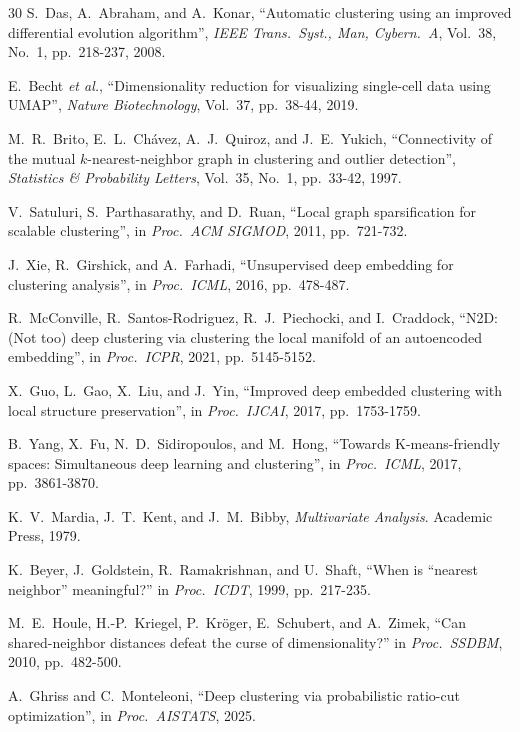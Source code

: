 \documentclass[journal]{IEEEtran}
\begin{document}
\begin{thebibliography}{30}
S.~Das, A.~Abraham, and A.~Konar, ``Automatic clustering using an improved differential evolution algorithm'', \emph{IEEE Trans.\ Syst., Man, Cybern.\ A}, Vol.~38, No.~1, pp.~218-237, 2008.

E.~Becht \emph{et al.}, ``Dimensionality reduction for visualizing single-cell data using UMAP'', \emph{Nature Biotechnology}, Vol.~37, pp.~38-44, 2019.

M.~R.~Brito, E.~L.~Ch\'{a}vez, A.~J.~Quiroz, and J.~E.~Yukich, ``Connectivity of the mutual $k$-nearest-neighbor graph in clustering and outlier detection'', \emph{Statistics \& Probability Letters}, Vol.~35, No.~1, pp.~33-42, 1997.

V.~Satuluri, S.~Parthasarathy, and D.~Ruan, ``Local graph sparsification for scalable clustering'', in \emph{Proc.\ ACM SIGMOD}, 2011, pp.~721-732.

J.~Xie, R.~Girshick, and A.~Farhadi, ``Unsupervised deep embedding for clustering analysis'', in \emph{Proc.\ ICML}, 2016, pp.~478-487.

R.~McConville, R.~Santos-Rodriguez, R.~J.~Piechocki, and I.~Craddock, ``N2D: (Not too) deep clustering via clustering the local manifold of an autoencoded embedding'', in \emph{Proc.\ ICPR}, 2021, pp.~5145-5152.

X.~Guo, L.~Gao, X.~Liu, and J.~Yin, ``Improved deep embedded clustering with local structure preservation'', in \emph{Proc.\ IJCAI}, 2017, pp.~1753-1759.

B.~Yang, X.~Fu, N.~D.~Sidiropoulos, and M.~Hong, ``Towards K-means-friendly spaces: Simultaneous deep learning and clustering'', in \emph{Proc.\ ICML}, 2017, pp.~3861-3870.

K.~V.~Mardia, J.~T.~Kent, and J.~M.~Bibby, \emph{Multivariate Analysis}. Academic Press, 1979.

K.~Beyer, J.~Goldstein, R.~Ramakrishnan, and U.~Shaft, ``When is ``nearest neighbor'' meaningful?'' in \emph{Proc.\ ICDT}, 1999, pp.~217-235.

M.~E.~Houle, H.-P.~Kriegel, P.~Kr\"{o}ger, E.~Schubert, and A.~Zimek, ``Can shared-neighbor distances defeat the curse of dimensionality?'' in \emph{Proc.\ SSDBM}, 2010, pp.~482-500.

A.~Ghriss and C.~Monteleoni, ``Deep clustering via probabilistic ratio-cut optimization'', in \emph{Proc.\ AISTATS}, 2025.

\end{thebibliography}
\end{document}
